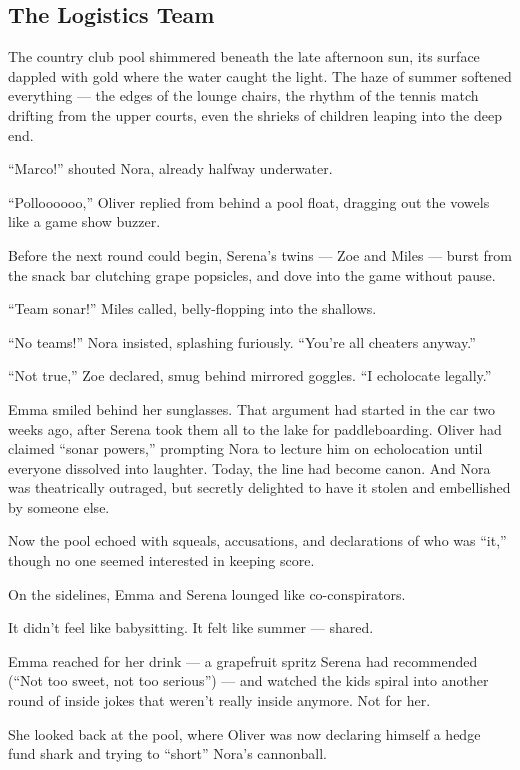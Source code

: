 \subsection{The Logistics Team}

The country club pool shimmered beneath the late afternoon sun, its surface dappled with gold where the 
water caught the light. The haze of summer softened everything — the edges of the lounge chairs, the 
rhythm of the tennis match drifting from the upper courts, even the shrieks of children leaping into 
the deep end.

``Marco!'' shouted Nora, already halfway underwater.

``Polloooooo,'' Oliver replied from behind a pool float, dragging out the vowels like a game show buzzer.

Before the next round could begin, Serena’s twins — Zoe and Miles — burst from the snack bar clutching 
grape popsicles, and dove into the game without pause.

``Team sonar!'' Miles called, belly-flopping into the shallows.

``No teams!'' Nora insisted, splashing furiously. ``You’re all cheaters anyway.''

``Not true,'' Zoe declared, smug behind mirrored goggles. ``I echolocate legally.''

Emma smiled behind her sunglasses. That argument had started in the car two weeks ago, after Serena 
took them all to the lake for paddleboarding. Oliver had claimed ``sonar powers,'' prompting Nora to 
lecture him on echolocation until everyone dissolved into laughter. Today, the line had become canon.
And Nora was theatrically outraged, but secretly delighted to have it stolen and embellished by someone else.

Now the pool echoed with squeals, accusations, and declarations of who was “it,”  
though no one seemed interested in keeping score.

On the sidelines, Emma and Serena lounged like co-conspirators.

It didn’t feel like babysitting. It felt like summer — shared.

Emma reached for her drink --- a grapefruit spritz Serena had recommended (``Not too sweet, not too serious'') 
--- and watched the kids spiral into another round of inside jokes that weren’t really inside anymore. 
Not for her.

She looked back at the pool, where Oliver was now declaring himself a hedge fund shark and trying to 
``short'' Nora’s cannonball.

